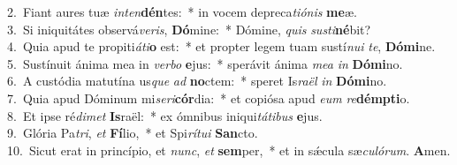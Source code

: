 {2.~}Fiant aures tuæ \textit{in}\textit{ten}\textbf{dén}tes:~* in vocem depreca\textit{ti}\textit{ó}\textit{nis} \textbf{me}æ.\\
{3.~}Si iniquitátes observá\textit{ve}\textit{ris}, \textbf{Dó}mine:~* Dómine, \textit{quis} \textit{su}\textit{sti}\textbf{né}bit?\\
{4.~}Quia apud te propiti\textit{á}\textit{ti}\textbf{o} est:~* et propter legem tuam sustí\textit{nu}\textit{i} \textit{te}, \textbf{Dó}\textbf{mi}ne.\\
{5.~}Sustínuit ánima mea in \textit{ver}\textit{bo} \textbf{e}jus:~* sperávit ánima \textit{me}\textit{a} \textit{in} \textbf{Dó}\textbf{mi}no.\\
{6.~}A custódia matutína us\textit{que} \textit{ad} \textbf{no}ctem:~* speret Is\textit{ra}\textit{ël} \textit{in} \textbf{Dó}\textbf{mi}no.\\
{7.~}Quia apud Dóminum mi\textit{se}\textit{ri}\textbf{cór}dia:~* et copiósa apud \textit{e}\textit{um} \textit{re}\textbf{dém}\textbf{pti}o.\\
{8.~}Et ipse ré\textit{di}\textit{met} \textbf{Is}raël:~* ex ómnibus iniqui\textit{tá}\textit{ti}\textit{bus} \textbf{e}jus.\\
{9.~}Glória Pa\textit{tri}, \textit{et} \textbf{Fí}lio,~* et Spi\textit{rí}\textit{tu}\textit{i} \textbf{San}cto.\\
{10.~}Sicut erat in princípio, et \textit{nunc}, \textit{et} \textbf{sem}per,~* et in sǽcula sæ\textit{cu}\textit{ló}\textit{rum}. \textbf{A}men.\\
